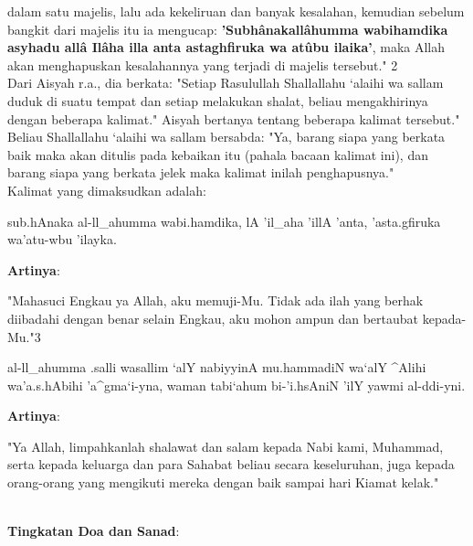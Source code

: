 \documentclass[a4paper,12pt]{article}
\begin{document}
dalam satu majelis, lalu ada kekeliruan dan banyak kesalahan, kemudian 
sebelum bangkit dari majelis itu ia mengucap: 
\textbf{'Subh\^{a}nakall\^{a}humma wabihamdika asyhadu all\^{a} 
Il\^{a}ha illa anta astaghfiruka wa at\^{u}bu ilaika'}, maka Allah 
akan menghapuskan kesalahannya yang terjadi di majelis tersebut." 
{\scriptsize 2}\\
\indent
Dari Aisyah r.a., dia berkata: "Setiap Rasulullah Shallallahu ‘alaihi wa 
sallam duduk di suatu tempat dan setiap melakukan shalat, beliau 
mengakhirinya dengan beberapa kalimat." Aisyah bertanya tentang beberapa 
kalimat tersebut." Beliau Shallallahu ‘alaihi wa sallam bersabda: "Ya, 
barang siapa yang berkata baik maka akan ditulis pada kebaikan itu (pahala 
bacaan kalimat ini), dan barang siapa yang berkata jelek maka kalimat 
inilah penghapusnya."\\
\indent
Kalimat yang dimaksudkan adalah: \\
\begin{arabtext}
\noindent
sub.hAnaka al-ll_ahumma wabi.hamdika, lA 'il_aha 'illA 'anta, 'asta.gfiruka
wa'atu-wbu 'ilayka.\\
\end{arabtext}
\noindent
\textbf{Artinya}:
\par
\indent
"Mahasuci Engkau ya Allah, aku memuji-Mu. Tidak ada ilah yang berhak 
diibadahi dengan benar selain Engkau, aku mohon ampun dan bertaubat 
kepada-Mu."{\scriptsize 3}\\
\begin{arabtext}
\noindent
al-ll_ahumma .salli wasallim `alY nabiyyinA mu.hammadiN wa`alY ^Alihi 
wa'a.s.hAbihi 'a^gma`i-yna, waman tabi`ahum bi-'i.hsAniN 'ilY yawmi 
al-ddi-yni.\\
\end{arabtext}
\noindent
\textbf{Artinya}:
\par
\indent
"Ya Allah, limpahkanlah shalawat dan salam kepada Nabi kami, Muhammad, 
serta kepada keluarga dan para Sahabat beliau secara keseluruhan, juga 
kepada orang-orang yang mengikuti mereka dengan baik sampai hari Kiamat 
kelak."\\\\
\par
\noindent
\textbf{Tingkatan Doa dan Sanad}:
\end{document}
